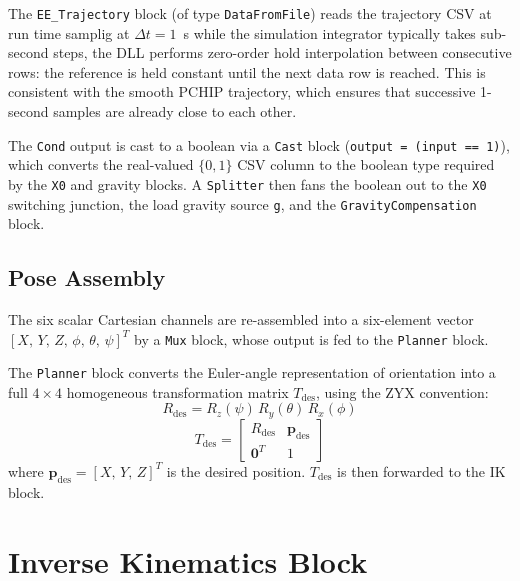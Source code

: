 The \texttt{EE\_Trajectory} block (of type \texttt{DataFromFile}) reads the trajectory CSV at run time samplig at $\Delta t = 1$~s while the simulation integrator typically takes sub-second steps, the DLL performs zero-order hold interpolation between consecutive rows: the reference is held constant until the next data row is reached.
This is consistent with the smooth PCHIP trajectory, which ensures that successive 1-second samples are already close to each other.

The \texttt{Cond} output is cast to a boolean via a \texttt{Cast} block (\texttt{output = (input == 1)}), which converts the real-valued $\{0, 1\}$ CSV column to the boolean type required by the \texttt{X0} and gravity blocks.
A \texttt{Splitter} then fans the boolean out to the \texttt{X0} switching junction, the load gravity source \texttt{g}, and the \texttt{GravityCompensation} block.

\subsection{Pose Assembly}

The six scalar Cartesian channels are re-assembled into a six-element vector \newline $[X,\,Y,\,Z,\,\phi,\,\theta,\,\psi]^T$ by a \texttt{Mux} block, whose output is fed to the \texttt{Planner} block.

The \texttt{Planner} block converts the Euler-angle representation of orientation into a full $4\times 4$ homogeneous transformation matrix $T_{\text{des}}$, using the ZYX convention:
\begin{equation}
  R_{\text{des}} = R_z(\psi)\,R_y(\theta)\,R_x(\phi)
\end{equation}
\begin{equation}
  T_{\text{des}} = \begin{bmatrix} R_{\text{des}} & \mathbf{p}_{\text{des}} \\ \mathbf{0}^T & 1 \end{bmatrix}
\end{equation}
where $\mathbf{p}_{\text{des}} = [X,\,Y,\,Z]^T$ is the desired position.
$T_{\text{des}}$ is then forwarded to the IK block.

\section{Inverse Kinematics Block}

